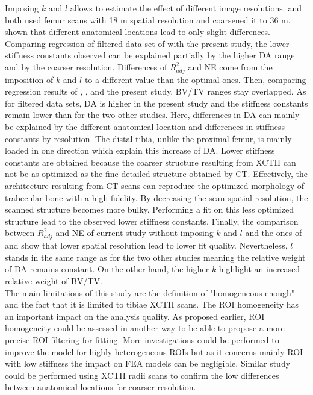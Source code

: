 \documentclass[a4paper,fleqn]{DC_ArtStyle}
\begin{document}
Imposing $k$ and $l$ allows to estimate the effect of different image resolutions.  \citeauthor{Panyasantisuk2015}\cite{Panyasantisuk2015} and \citeauthor{Gross2013}\cite{Gross2013} both used femur scans with 18 \si{\micro}m spatial resolution and coarsened it to 36 \si{\micro}m. \citeauthor{Gross2013}\cite{Gross2013} shown that different anatomical locations lead to only slight differences. Comparing regression of filtered data set of \citeauthor{Panyasantisuk2015}\cite{Panyasantisuk2015} with the present study, the lower stiffness constants observed can be explained partially by the higher DA range and by the coarser resolution. Differences of $R^2_{adj}$ and NE come from the imposition of $k$ and $l$ to a different value than the optimal ones. Then, comparing regression results of \citeauthor{Panyasantisuk2015}\cite{Panyasantisuk2015}, \citeauthor{Gross2013}\cite{Gross2013}, and the present study, BV/TV ranges stay overlapped. As for filtered data sets, DA is higher in the present study and the stiffness constants remain lower than for the two other studies. Here, differences in DA can mainly be explained by the different anatomical location and differences in stiffness constants by resolution. The distal tibia, unlike the proximal femur, is mainly loaded in one direction which explain this increase of DA. Lower stiffness constants are obtained because the coarser structure resulting from XCTII can not be as optimized as the fine detailed structure obtained by \si{\micro}CT. Effectively, the architecture resulting from \si{\micro}CT scans can reproduce the optimized morphology of trabecular bone with a high fidelity. By decreasing the scan spatial resolution, the scanned structure becomes more bulky. Performing a fit on this less optimized structure lead to the observed lower stiffness constants. Finally, the comparison between $R^2_{adj}$ and NE of current study without imposing $k$ and $l$ and the ones of \citeauthor{Panyasantisuk2015}\cite{Panyasantisuk2015} and  \citeauthor{Gross2013}\cite{Gross2013} show that lower spatial resolution lead to lower fit quality. Nevertheless, $l$ stands in the same range as for the two other studies meaning the relative weight of DA remains constant. On the other hand, the higher $k$ highlight an increased relative weight of BV/TV.\\

The main limitations of this study are the definition of "homogeneous enough" and the fact that it is limited to tibiae XCTII scans. The ROI homogeneity has an important impact on the analysis quality. As proposed earlier, ROI homogeneity could be assessed in another way to be able to propose a more precise ROI filtering for fitting. More investigations could be performed to improve the model for highly heterogeneous ROIs but as it concerns mainly ROI with low stiffness the impact on FEA models can be negligible. Similar study could be performed using XCTII radii scans to confirm the low differences between anatomical locations for coarser resolution.\\
\end{document}
